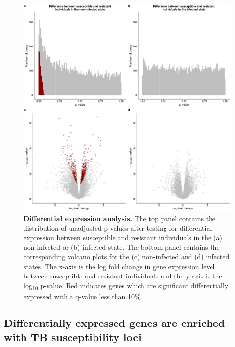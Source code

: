 \begin{figure}[p]
\centering
\includegraphics[width=5in]{img/ch03/limma.pdf}
\caption[Differential expression analysis.]{
\textbf{Differential expression analysis.} The top panel contains the
distribution of unadjusted p-values after testing for differential
expression between susceptible and resistant individuals in the (a)
non-infected or (b) infected state. The bottom panel contains the
corresponding volcano plots for the (c) non-infected and (d) infected
states. The x-axis is the log fold change in gene expression level
between susceptible and resistant individuals and the y-axis is the
–log\textsubscript{10} p-value. Red indicates genes which are
significant differentially expressed with a q-value less than 10\%.
}
\label{fig:limma}
\end{figure}
\subsection{Differentially expressed genes are enriched with TB susceptibility loci}

